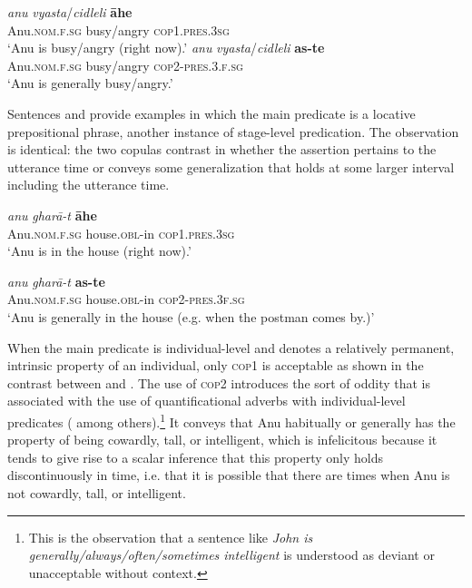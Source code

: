 \documentclass[output=paper,hidelinks]{langscibook}
\begin{document}
 \ea \label{stage1}
\ea
\gll \emph{anu} \emph{vyasta}/\emph{cidleli} \textbf{āhe}\\
Anu.\textsc{nom.f.sg} busy/angry \textsc{cop1.pres.3sg}\\
\glt `Anu is busy/angry (right now).' \label{stage1a}
\ex
\gll \emph{anu} \emph{vyasta}/\emph{cidleli} \textbf{as-te}\\
Anu.\textsc{nom.f.sg} busy/angry \textsc{cop2-pres.3.f.sg}\\
\glt `Anu is generally busy/angry.' \label{stage1bb}
\z
\z
{}

Sentences  and  provide examples in which the main predicate is a locative prepositional phrase, another instance of stage-level predication. The observation is identical: the two copulas contrast in whether the assertion pertains to the utterance time or conveys some generalization that holds at some larger interval including the utterance time.

\ea \label{loc}
\ea
\gll
 \emph{anu} \emph{gharā-t} \textbf{āhe}\\
Anu.\textsc{nom.f.sg} house.\textsc{obl}-in \textsc{cop1.pres.3sg}\\
\glt `Anu is in the house (right now).' \label{loca}
 
\ex
\gll \emph{anu} \emph{gharā-t} \textbf{as-te}\\
Anu.\textsc{nom.f.sg} house.\textsc{obl}-in \textsc{cop2-pres.3f.sg}\\
\glt `Anu is generally in the house (e.g. when the postman comes by.)' \label{locb}
\z
\z
{}

When the main predicate is individual-level and denotes a relatively permanent, intrinsic property of an individual, only \textsc{cop1} is acceptable as shown in the contrast between  and . The use of \textsc{cop2} introduces the sort of oddity that is associated with the use of quantificational adverbs with individual-level predicates (\citealt{kratzer95stage, chierchia1995, magri2009} among others).\footnote{This is the observation that a sentence like \emph{John is generally/always/often/sometimes intelligent} is understood as deviant or unacceptable without context.} It conveys that Anu habitually or generally has the property of being cowardly, tall, or intelligent, which is infelicitous because it tends to give rise to a scalar inference that this property only holds discontinuously in time, i.e. that it is possible that there are times when Anu is not cowardly, tall, or intelligent.
\end{document}
